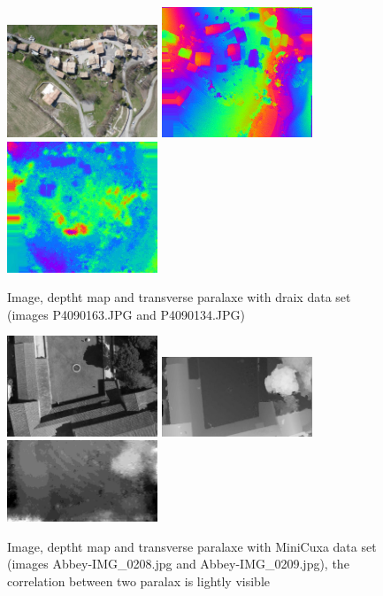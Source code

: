 \begin{figure}
\begin{center}
\includegraphics[width=45mm]{FIGS/TestOri/DraixIl.JPG}
\includegraphics[width=45mm]{FIGS/TestOri/DraixPx1.jpg}
\includegraphics[width=45mm]{FIGS/TestOri/DraixPx2.jpg}
\end{center}
\caption{Image, deptht map and transverse paralaxe with draix data set
(images P4090163.JPG and P4090134.JPG)
}
\label{FIG:Draix:PxTr}
\end{figure}



\begin{figure}
\begin{center}
\includegraphics[width=45mm]{FIGS/TestOri/CuxIm.jpg}
\includegraphics[width=45mm]{FIGS/TestOri/CuxPx1.jpg}
\includegraphics[width=45mm]{FIGS/TestOri/CuxPx2.jpg}
\end{center}
\caption{Image, deptht map and transverse paralaxe with MiniCuxa data set
(images Abbey-IMG\_0208.jpg and Abbey-IMG\_0209.jpg), the correlation between two paralax
is lightly visible
}
\label{FIG:Cuxa:PxTr}
\end{figure}

